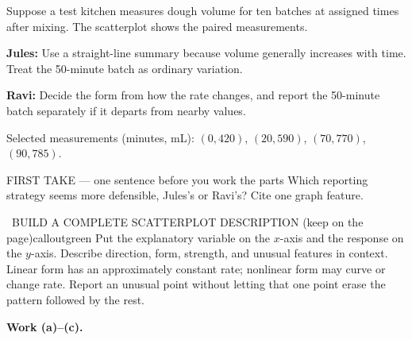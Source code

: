 \documentclass[11pt]{article}
\begin{document}


Suppose a test kitchen measures dough volume for ten batches at assigned times after mixing. The scatterplot shows the paired measurements.\par\smallskip \textbf{Jules:} Use a straight-line summary because volume generally increases with time. Treat the 50-minute batch as ordinary variation.\par \textbf{Ravi:} Decide the form from how the rate changes, and report the 50-minute batch separately if it departs from nearby values.\par Selected measurements (minutes, mL): $(0,420)$, $(20,590)$, $(70,770)$, $(90,785)$.\par
\begin{center}
\end{center}
\begin{firsttakebox}{FIRST TAKE --- one sentence before you work the parts}
Which reporting strategy seems more defensible, Jules's or Ravi's? Cite one graph feature.
\workspace{0.85in}
\end{firsttakebox}

\begin{callout}{\IconBook\ BUILD A COMPLETE SCATTERPLOT DESCRIPTION (keep on the page)}{calloutgreen}
Put the explanatory variable on the $x$-axis and the response on the $y$-axis.
Describe direction, form, strength, and unusual features in context. Linear form has
an approximately constant rate; nonlinear form may curve or change rate. Report an
unusual point without letting that one point erase the pattern followed by the rest.
\end{callout}

\newpage
\textbf{Work (a)--(c).}\par\smallskip
\end{document}

